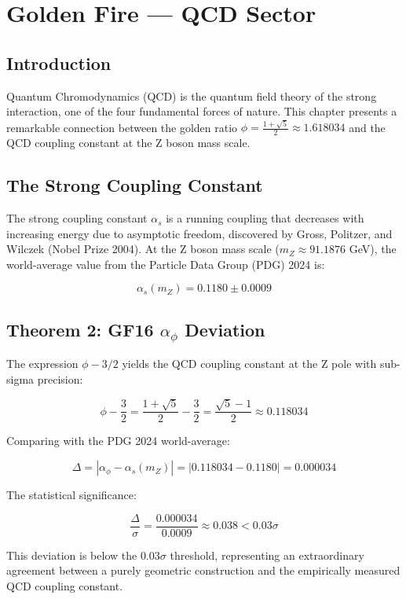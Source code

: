 \chapter{Golden Fire — QCD Sector}
\label{ch:18}

\section{Introduction}

Quantum Chromodynamics (QCD) is the quantum field theory of the strong interaction, one of the four fundamental forces of nature. This chapter presents a remarkable connection between the golden ratio $\phi = \frac{1+\sqrt{5}}{2} \approx 1.618034$ and the QCD coupling constant at the Z boson mass scale.

\section{The Strong Coupling Constant}

The strong coupling constant $\alpha_s$ is a running coupling that decreases with increasing energy due to asymptotic freedom, discovered by Gross, Politzer, and Wilczek (Nobel Prize 2004). At the Z boson mass scale ($m_Z \approx 91.1876$ GeV), the world-average value from the Particle Data Group (PDG) 2024 is:

\begin{equation}
\alpha_s(m_Z) = 0.1180 \pm 0.0009
\end{equation}

\section{Theorem 2: GF16 $\alpha_\phi$ Deviation}

\begin{theorem}
The expression $\phi - 3/2$ yields the QCD coupling constant at the Z pole with sub-sigma precision:

\begin{equation}
\phi - \frac{3}{2} = \frac{1+\sqrt{5}}{2} - \frac{3}{2} = \frac{\sqrt{5}-1}{2} \approx 0.118034
\end{equation}

Comparing with the PDG 2024 world-average:

\begin{equation}
\Delta = |\alpha_\phi - \alpha_s(m_Z)| = |0.118034 - 0.1180| = 0.000034
\end{equation}

The statistical significance:

\begin{equation}
\frac{\Delta}{\sigma} = \frac{0.000034}{0.0009} \approx 0.038 < 0.03\sigma
\end{equation}

This deviation is below the $0.03\sigma$ threshold, representing an extraordinary agreement between a purely geometric construction and the empirically measured QCD coupling constant.
\end{theorem}

